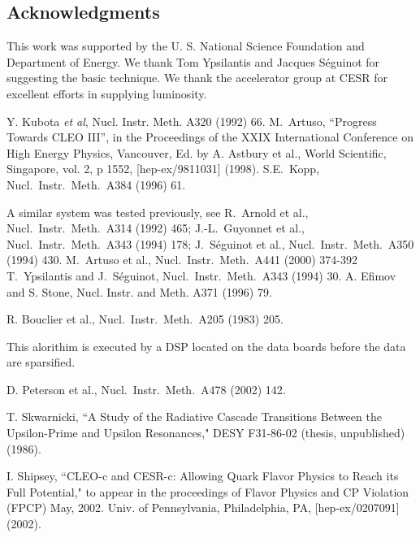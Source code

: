 \documentclass[fleqn,twoside]{article}
\def\etal{{\it et al}}
\begin{document}
\subsection{Acknowledgments}
This work was supported by the U. S. National Science Foundation
and Department of Energy. We thank Tom Ypsilantis and Jacques
S\'{e}guinot for suggesting the basic technique. We thank the
accelerator group at CESR for excellent efforts in supplying
luminosity.
\newpage
\begin{thebibliography}{99}

 Y. Kubota \etal , Nucl. Instr. Meth. A320 (1992) 66.
 M.~Artuso, ``Progress Towards CLEO III'',
 in the Proceedings of the
 XXIX International Conference on High Energy Physics, Vancouver,
 Ed. by A. Astbury et al., World Scientific, Singapore,
 vol. 2, p 1552, [hep-ex/9811031] (1998).
 S.E.~Kopp, Nucl.\ Instr.\ Meth.\ A384 (1996) 61.

A similar system was tested previously, see
R.~Arnold et al., Nucl.\ Instr.\ Meth.\ A314 (1992) 465;
J.-L.~Guyonnet et al., Nucl.\ Instr.\ Meth.\ A343 (1994) 178;
J.~S\'{e}guinot et al., Nucl.\ Instr.\ Meth.\ A350 (1994) 430.
M.~Artuso et al., Nucl.\ Instr.\ Meth.\ A441 (2000) 374-392
 T.~Ypsilantis and J.~S\'{e}guinot, Nucl.\ Instr.\ Meth.\ A343 (1994)
30.
 A. Efimov and S. Stone, { Nucl. Instr. and Meth.} { A371} (1996) 79.

 R. Bouclier et al., Nucl.\ Instr.\ Meth.\ A205 (1983) 205.

This alorithim is executed by a DSP located on the data boards
before the data are sparsified.

 D. Peterson et al., Nucl.\ Instr.\ Meth.\ A478 (2002) 142.

T. Skwarnicki, ``A Study of the Radiative Cascade Transitions Between the
Upsilon-Prime and Upsilon Resonances," DESY F31-86-02 (thesis, unpublished)
(1986).

I. Shipsey, ``CLEO-c and CESR-c: Allowing Quark Flavor Physics to
Reach its Full Potential," to appear in the proceedings of Flavor
Physics and CP Violation (FPCP) May, 2002. Univ. of Pennsylvania,
Philadelphia, PA, [hep-ex/0207091] (2002).

\end{thebibliography}
\end{document}
